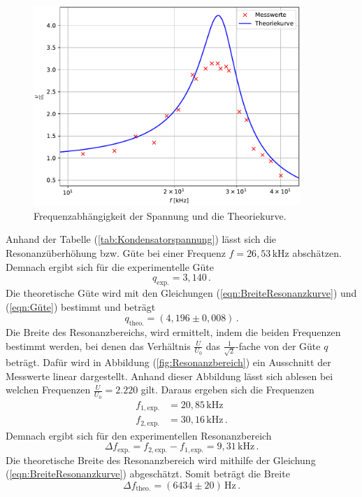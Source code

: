 \begin{figure}[H]
  \centering
  \includegraphics[width=0.90\textwidth]{plot_b.pdf}
  \caption{Frequenzabhängigkeit der Spannung und die Theoriekurve.}
  \label{fig:Frequenzabhängigkeit}
\end{figure}
Anhand der Tabelle (\ref{tab:Kondensatorspannung}) lässt sich die Resonanzüberhöhung bzw. Güte bei einer Frequenz $f = 26,53\,\unit{\kilo\hertz}$ abschätzen. Demnach ergibt sich für die 
experimentelle Güte
$$q_{\text{exp.}}= 3,140\,.$$
Die theoretische Güte wird mit den Gleichungen (\ref{eqn:BreiteResonanzkurve}) und (\ref{eqn:Güte}) bestimmt und beträgt
$$q_{\text{theo.}}=\left( 4,196\pm0,008 \right)\,.$$
Die Breite des Resonanzbereichs, wird ermittelt, indem die beiden Frequenzen bestimmt werden, bei denen das Verhältnis $\frac{U}{U_0}$ das $\frac{1}{\sqrt{2}}$-fache von der
Güte $q$ beträgt. Dafür wird in Abbildung (\ref{fig:Resonanzbereich}) ein Ausschnitt der Messwerte linear dargestellt. Anhand dieser Abbildung lässt sich ablesen
bei welchen Frequenzen $\frac{U}{U_0} = 2.220$ gilt.
Daraus ergeben sich die Frequenzen
\begin{align*}
  f_{1,\text{exp.}} &= 20,85\,\unit{\kilo\hertz}\\
  f_{2,\text{exp.}} &= 30,16\,\unit{\kilo\hertz}\,.
\end{align*}
Demnach ergibt sich für den experimentellen Resonanzbereich 
$$\Delta f_{\text{exp.}}=  f_{2,\text{exp.}}-  f_{1,\text{exp.}}= 9,31\,\unit{\kilo\hertz}\,.$$
Die theoretische Breite des Resonanzbereich wird mithilfe der Gleichung (\ref{eqn:BreiteResonanzkurve}) abgeschätzt. Somit beträgt die Breite
$$\Delta f_{\text{theo.}}= \left(6434\pm20\right)\,\unit{\hertz}\,.$$
